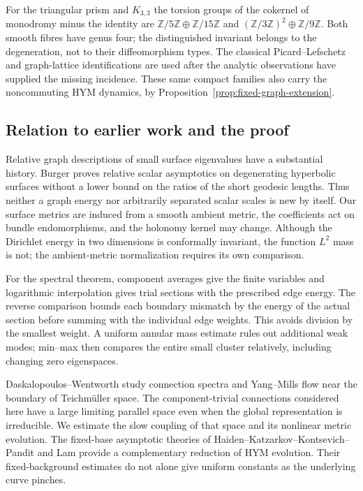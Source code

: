 For the triangular prism and $K_{3,3}$ the
torsion groups of the cokernel of monodromy minus the identity are
$\mathbb Z/5\mathbb Z\oplus\mathbb Z/15\mathbb Z$
and $(\mathbb Z/3\mathbb Z)^2\oplus\mathbb Z/9\mathbb Z$.
Both smooth fibres have genus four; the
distinguished invariant belongs to the
degeneration, not to their diffeomorphism
types. The classical Picard--Lefschetz and
graph-lattice identifications
\cite{achinger-ogus,bacher-harpe-nagnibeda}
are used after the analytic observations
have supplied the missing incidence.
These same compact families also carry
the noncommuting HYM dynamics, by
Proposition~\ref{prop:fixed-graph-extension}.

\subsection{Relation to earlier work and the proof}
Relative graph descriptions of small surface
eigenvalues have a substantial history. Burger
\cite[Theorem~1.1]{burger} proves relative scalar
asymptotics on degenerating hyperbolic surfaces
without a lower bound on the ratios of the short
geodesic lengths. Thus neither a graph energy nor
arbitrarily separated scalar scales is new by itself.
Our surface metrics are induced from a smooth ambient
metric, the coefficients act on bundle endomorphisms,
and the holonomy kernel may change. Although the
Dirichlet energy in two dimensions is conformally
invariant, the function $L^2$ mass is not; the
ambient-metric normalization requires its own
comparison.

For the spectral theorem, component averages
give the finite variables and logarithmic
interpolation gives trial sections with the
prescribed edge energy. The reverse comparison
bounds each boundary mismatch by the energy
of the actual section before summing with the
individual edge weights. This avoids division
by the smallest weight. A uniform annular
mass estimate rules out additional weak modes;
min--max then compares the entire small
cluster relatively, including changing
zero eigenspaces.

Daskalopoulos--Wentworth \cite{dw} study connection
spectra and Yang--Mills flow near the boundary of
Teichm\"uller space. The component-trivial connections
considered here have a large limiting parallel
space even when the global representation is
irreducible. We estimate the slow coupling of that
space and its nonlinear metric evolution.
The fixed-base asymptotic theories of
Haiden--Katzarkov--Kontsevich--Pandit \cite{hkkp}
and Lam \cite{lam} provide a complementary
reduction of HYM evolution. Their fixed-background
estimates do not alone give uniform constants
as the underlying curve pinches.

